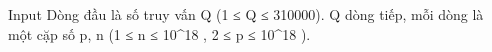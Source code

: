 Input
Dòng đầu là số truy vấn Q (1 ≤ Q ≤ 310000). Q dòng tiếp, mỗi dòng là một cặp số p, n (1 ≤ n ≤ 10^18 , 2 ≤ p ≤ 10^18 ).